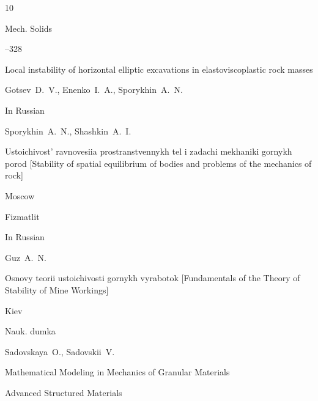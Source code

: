 \begin{thebibliography}{10}

\jour Mech. Solids




–328

\paper Local instability of horizontal elliptic excavations in elastoviscoplastic rock masses

\by Gotsev~D.~V., Enenko~I.~A., Sporykhin~A.~N.









\lang In Russian

\by Sporykhin~A.~N., Shashkin~A.~I.

\book Ustoichivost' ravnovesiia prostranstvennykh tel i zadachi mekhaniki gornykh porod \rm [Stability of spatial equilibrium of bodies and problems of the mechanics of rock]

\publaddr Moscow

\publ Fizmatlit








\lang In Russian

\by Guz~A.~N.

\book Osnovy teorii ustoichivosti gornykh vyrabotok \rm [Fundamentals of the Theory of Stability of Mine Workings]

\publaddr Kiev

\publ Nauk. dumka








\by Sadovskaya~O., Sadovskii~V.

\book Mathematical Modeling in Mechanics of Granular Materials

\serial    Advanced Structured Materials




\end{thebibliography}
